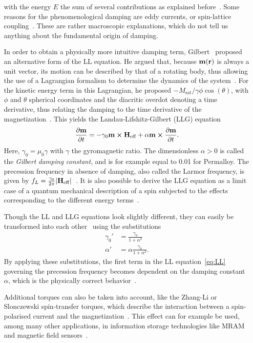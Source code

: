 \documentclass[11pt,a4paper,english,twoside]{article}
\begin{document}
with the energy $E$ the sum of several contributions as explained before~\cite{ThermFluc_SingleDomain}. Some reasons for the phenomenological damping are eddy currents, or spin-lattice coupling~\cite{phd_leliaert}. These are rather macroscopic explanations, which do not tell us anything about the fundamental origin of damping.
\par
In order to obtain a physically more intuitive damping term, Gilbert~\cite{Gilbert1955ALF} proposed an alternative form of the LL equation. He argued that, because $\vb{m}(\vb{r})$ is always a unit vector, its motion can be described by that of a rotating body, thus allowing the use of a Lagrangian formalism to determine the dynamics of the system~\cite{abert2013discrete}. For the kinetic energy term in this Lagrangian, he proposed $-M_\mathrm{sat}/\gamma \dot{\phi} \cos(\theta)$, with $\phi$ and $\theta$ spherical coordinates and the diacritic overdot denoting a time derivative, thus relating the damping to the time derivative of the magnetization~\cite{abert2013discrete}. This yields the Landau-Lifshitz-Gilbert (LLG) equation~\cite{phd_leliaert, ThermFluc_SingleDomain, LEL-17b}
\begin{equation}
    \frac{\partial \vb{m}}{\partial t} = - \gamma_0 \vb{m} \cross \vb{H_\mathrm{eff}} + \alpha \vb{m} \cross \frac{\partial \vb{m}}{\partial t} \mathrm{.}
    \label{eq:LLG}
\end{equation}
Here, $\gamma_0=\mu_0 \gamma$ with $\gamma$ the gyromagnetic ratio. The dimensionless $\alpha > 0$ is called the \textit{Gilbert damping constant}, and is for example equal to 0.01 for Permalloy. The precession frequency in absence of damping, also called the Larmor frequency, is given by  $f_L=\frac{\gamma_0}{2\pi}\abs{\vb{H_\mathrm{eff}}}$~\cite{phd_leliaert}.
It is also possible to derive the LLG equation as a limit case of a quantum mechanical description of a spin subjected to the effects corresponding to the different energy terms~\cite{abert2013discrete,bode2012current}. \par
Though the LL and LLG equations look slightly different, they can easily be transformed into each other~\cite{phd_leliaert,ThermFluc_SingleDomain} using the substitutions
\begin{align*}
    \gamma_0' &= \frac{\gamma_0}{1+\alpha^2} \\
    \alpha' &= \alpha \frac{\gamma_0}{1+\alpha^2} \mathrm{.}
\end{align*}
By applying these substitutions, the first term in the LL equation~\eqref{eq:LL} governing the precession frequency becomes dependent on the damping constant $\alpha$, which is the physically correct behavior~\cite{phd_leliaert}. \par
Additional torques can also be taken into account, like the Zhang-Li or Slonczewski spin-transfer torques, which describe the interaction between a spin-polarised current and the magnetization~\cite{syllabus_PoAEaPD, MuMax3, ZhangLiSpinTransferTorque}. This effect can for example be used, among many other applications, in information storage technologies like MRAM and magnetic field sensors~\cite{syllabus_PoAEaPD}.
\end{document}
